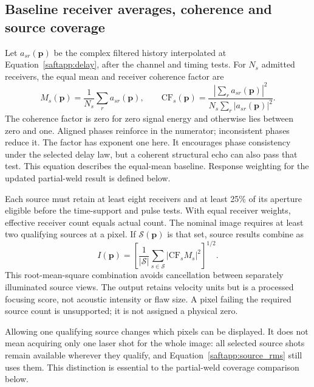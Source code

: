\subsection{Baseline receiver averages, coherence and source coverage}
Let $a_{sr}(\mathbf p)$ be the complex filtered history interpolated at Equation~\ref{saftapp:delay}, after the channel and timing tests. For $N_s$ admitted receivers, the equal mean and receiver coherence factor are
\begin{equation}
 M_s(\mathbf p)=\frac{1}{N_s}\sum_r a_{sr}(\mathbf p),\qquad
 \mathrm{CF}_s(\mathbf p)=\frac{|\sum_r a_{sr}(\mathbf p)|^2}
 {N_s\sum_r|a_{sr}(\mathbf p)|^2}.
\label{saftapp:cf}
\end{equation}
The coherence factor is zero for zero signal energy and otherwise lies between zero and one. Aligned phases reinforce in the numerator; inconsistent phases reduce it. The factor has exponent one here. It encourages phase consistency under the selected delay law, but a coherent structural echo can also pass that test. This equation describes the equal-mean baseline. Response weighting for the updated partial-weld result is defined below.

Each source must retain at least eight receivers and at least 25\% of its aperture eligible before the time-support and pulse tests. With equal receiver weights, effective receiver count equals actual count. The nominal image requires at least two qualifying sources at a pixel. If $\mathcal S(\mathbf p)$ is that set, source results combine as
\begin{equation}
 I(\mathbf p)=\left[\frac{1}{|\mathcal S|}\sum_{s\in\mathcal S}
                 |\mathrm{CF}_s M_s|^2\right]^{1/2}.
\label{saftapp:source_rms}
\end{equation}
This root-mean-square combination avoids cancellation between separately illuminated source views. The output retains velocity units but is a processed focusing score, not acoustic intensity or flaw size. A pixel failing the required source count is unsupported; it is not assigned a physical zero.

Allowing one qualifying source changes which pixels can be displayed. It does not mean acquiring only one laser shot for the whole image: all selected source shots remain available wherever they qualify, and Equation~\ref{saftapp:source_rms} still uses them. This distinction is essential to the partial-weld coverage comparison below.

